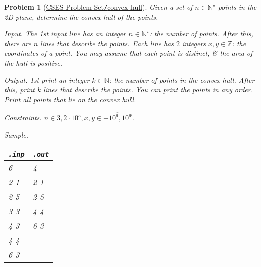 \documentclass{article}
\newtheorem{problem}{Problem}
\begin{document}
\begin{problem}[\href{https://cses.fi/problemset/task/2195}{CSES Problem Set{\tt/}convex hull}]
    Given a set of $n\in\mathbb{N}^\star$ points in the 2D plane, determine the convex hull of the points.
    \item {\sf Input.} The 1st input line has an integer $n\in\mathbb{N}^\star$: the number of points.  After this, there are $n$ lines that describe the points. Each line has $2$ integers $x,y\in\mathbb{Z}$: the coordinates of a point. You may assume that each point is distinct, \& the area of the hull is positive.
    \item {\sf Output.} 1st print an integer $k\in\mathbb{N}$: the number of points in the convex hull. After this, print $k$ lines that describe the points. You can print the points in any order. Print all points that lie on the convex hull.
    \item {\sf Constraints.} $n\in\overline{3,2\cdot10^5},x,y\in\overline{-10^9,10^9}$.
    \item {\sf Sample.}
    \begin{table}[H]
        \centering
        \begin{tabular}{|l|l|}
            \hline
            \verb|.inp| & \verb|.out| \\
            \hline
            6 & 4 \\
            2 1 & 2 1 \\
            2 5 & 2 5 \\
            3 3 & 4 4 \\
            4 3 & 6 3 \\
            4 4 & \\
            6 3 & \\
            \hline
        \end{tabular}
    \end{table}
\end{problem}
\end{document}
